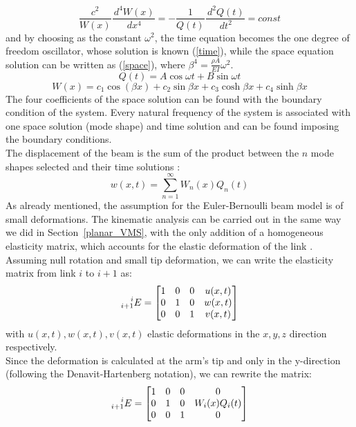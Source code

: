 \documentclass[a4paper,12pt,oneside]{report}
\begin{document}
\begin{equation}
\frac{c^2}{W(x)}\frac{\,d^4W(x)}{\,dx^4}=-\frac{1}{Q(t)}\frac{\,d^2Q(t)}{\,dt^2}=const
\end{equation}
and by choosing as the constant $\omega^2$, the time equation becomes the one degree of freedom oscillator, whose solution is known (\ref{time}), while the space equation solution can be written as (\ref{space}), where $\beta^4=\frac{\rho A}{EI}\omega^2$.
\begin{equation}
Q(t)=A\cos{\omega t}+B\sin{\omega t}
\label{time}
\end{equation}
\begin{equation}
W(x)=c_1\cos(\beta x)+c_2\sin{\beta x}+c_3\cosh{\beta x}+c_4\sinh{\beta x}
\label{space}
\end{equation}
The four coefficients of the space solution can be found with the boundary condition of the system. Every natural frequency of the system is associated with one space solution (mode shape) and time solution and can be found imposing the boundary conditions.\\
The displacement of the beam is the sum of the product between the $n$ mode shapes selected and their time solutions \cite{sixteen,seventeen,eighteen}:
\begin{equation}
w(x,t)=\sum_{n=1}^\infty W_n(x)Q_n(t)
\label{overall}
\end{equation}
As already mentioned, the assumption for the Euler-Bernoulli beam model is of small deformations. The kinematic analysis can be carried out in the same way we did in Section~\ref{planar_VMS}, with the only addition of a homogeneous elasticity matrix, which accounts for the elastic deformation of the link \cite{seventeen}. Assuming null rotation and small tip deformation, we can write the elasticity matrix from link $i$ to $i+1$ as:
\begin{equation}
  \prescript{i}{i+1}{E}=\begin{bmatrix}
    1&0&0&u(x,t)\\
    0&1&0&w(x,t)\\
    0&0&1&v(x,t)
  \end{bmatrix}
\end{equation}
with $u(x,t),w(x,t),v(x,t)$ elastic deformations in the $x,y,z$ direction respectively.\\
Since the deformation is calculated at the arm's tip and only in the y-direction (following the Denavit-Hartenberg notation), we can rewrite the matrix:
\begin{equation}
  \prescript{i}{i+1}{E}=\begin{bmatrix}
    1&0&0&0\\
    0&1&0&W_i(x)Q_i(t)\\
    0&0&1&0
  \end{bmatrix}
\end{equation}
\end{document}
